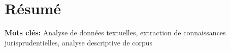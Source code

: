 \chapter*{Résumé}

\textbf{Mots clés:} Analyse de données textuelles, extraction de connaissances jurisprudentielles, analyse descriptive de corpus

